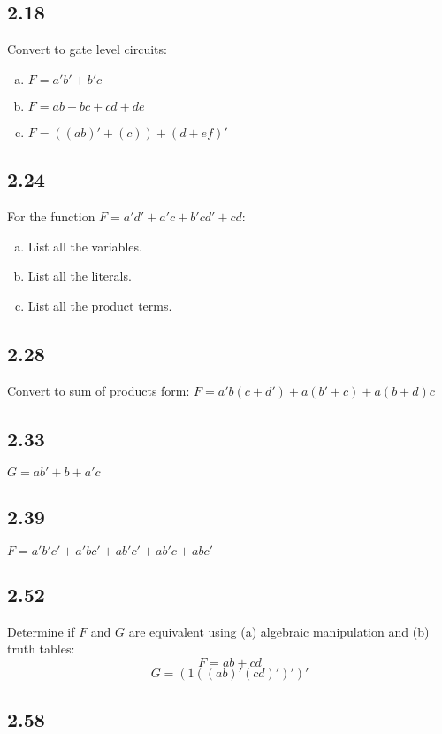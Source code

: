 \documentclass{article}
\begin{document}
\subsection*{2.18}
Convert to gate level circuits:
\begin{enumerate}[(a)]
    \item $F = a'b' + b'c$
    \item $F = ab + bc + cd + de$
    \item $F = ((ab)' + (c)) + (d + ef)'$
\end{enumerate}

\subsection*{2.24}
For the function $F = a'd' + a'c + b'cd' + cd$:
\begin{enumerate}[(a)]
    \item List all the variables.
    \item List all the literals.
    \item List all the product terms.
\end{enumerate}

\subsection*{2.28}
Convert to sum of products form:
$F = a'b(c + d') + a(b' + c) + a(b + d)c$

\subsection*{2.33}
$ G = ab' + b + a'c $

\subsection*{2.39}
$ F = a'b'c' + a'bc' + ab'c' + ab'c + abc' $

\subsection*{2.52}
Determine if $F$ and $G$ are equivalent using (a) algebraic manipulation and (b) truth tables: \\
$$ F = ab + cd $$
$$ G = (1((ab)'(cd)')')' $$

\subsection*{2.58}
\end{document}

